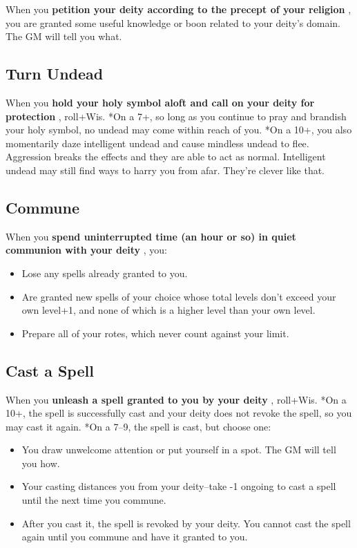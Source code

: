 When you \textbf{petition your deity according to the precept of your religion}
, you are granted some useful knowledge or boon related to your deity's domain. The GM will tell you what.
\subsection{Turn Undead}

When you \textbf{hold your holy symbol aloft and call on your deity for protection}
, roll+Wis. *On a 7+, so long as you continue to pray and brandish your holy symbol, no undead may come within reach of you. *On a 10+, you also momentarily daze intelligent undead and cause mindless undead to flee. Aggression breaks the effects and they are able to act as normal. Intelligent undead may still find ways to harry you from afar. They're clever like that.
\subsection{Commune}

When you \textbf{spend uninterrupted time (an hour or so) in quiet communion with your deity}
, you:
\begin{itemize}
\item Lose any spells already granted to you.
\item Are granted new spells of your choice whose total levels don't exceed your own level+1, and none of which is a higher level than your own level.
\item Prepare all of your rotes, which never count against your limit.

\end{itemize}
\subsection{Cast a Spell}

When you \textbf{unleash a spell granted to you by your deity}
, roll+Wis. *On a 10+, the spell is successfully cast and your deity does not revoke the spell, so you may cast it again. *On a 7--9, the spell is cast, but choose one:
\begin{itemize}
\item You draw unwelcome attention or put yourself in a spot. The GM will tell you how.
\item Your casting distances you from your deity--take -1 ongoing to cast a spell until the next time you commune.
\item After you cast it, the spell is revoked by your deity. You cannot cast the spell again until you commune and have it granted to you.

\end{itemize}

